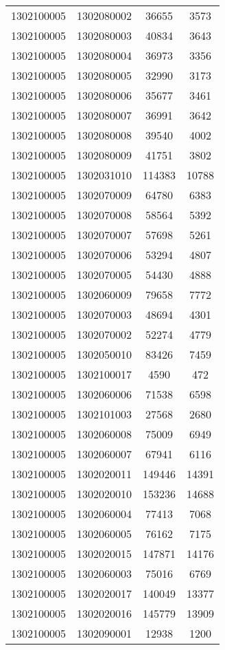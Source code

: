 \begin{longtable}[h]{llcc}
		1302100005 & 1302080002 & 36655 & 3573\\
		1302100005 & 1302080003 & 40834 & 3643\\
		1302100005 & 1302080004 & 36973 & 3356\\
		1302100005 & 1302080005 & 32990 & 3173\\
		1302100005 & 1302080006 & 35677 & 3461\\
		1302100005 & 1302080007 & 36991 & 3642\\
		1302100005 & 1302080008 & 39540 & 4002\\
		1302100005 & 1302080009 & 41751 & 3802\\
		1302100005 & 1302031010 & 114383 & 10788\\
		1302100005 & 1302070009 & 64780 & 6383\\
		1302100005 & 1302070008 & 58564 & 5392\\
		1302100005 & 1302070007 & 57698 & 5261\\
		1302100005 & 1302070006 & 53294 & 4807\\
		1302100005 & 1302070005 & 54430 & 4888\\
		1302100005 & 1302060009 & 79658 & 7772\\
		1302100005 & 1302070003 & 48694 & 4301\\
		1302100005 & 1302070002 & 52274 & 4779\\
		1302100005 & 1302050010 & 83426 & 7459\\
		1302100005 & 1302100017 & 4590 & 472\\
		1302100005 & 1302060006 & 71538 & 6598\\
		1302100005 & 1302101003 & 27568 & 2680\\
		1302100005 & 1302060008 & 75009 & 6949\\
		1302100005 & 1302060007 & 67941 & 6116\\
		1302100005 & 1302020011 & 149446 & 14391\\
		1302100005 & 1302020010 & 153236 & 14688\\
		1302100005 & 1302060004 & 77413 & 7068\\
		1302100005 & 1302060005 & 76162 & 7175\\
		1302100005 & 1302020015 & 147871 & 14176\\
		1302100005 & 1302060003 & 75016 & 6769\\
		1302100005 & 1302020017 & 140049 & 13377\\
		1302100005 & 1302020016 & 145779 & 13909\\
		1302100005 & 1302090001 & 12938 & 1200\\

\end{longtable}
